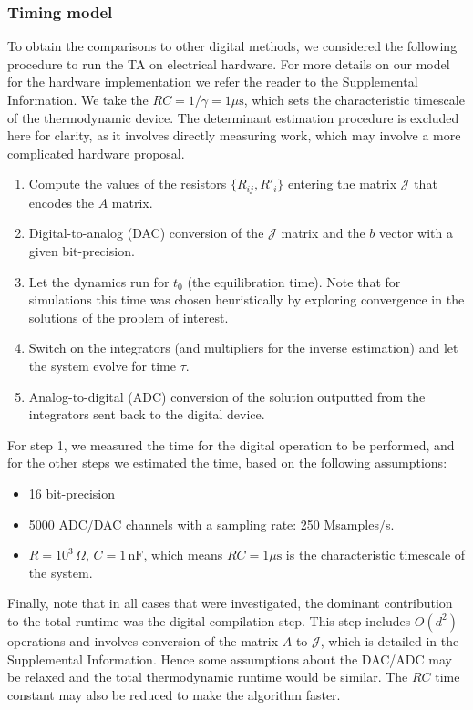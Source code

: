 \documentclass[prx,onecolumn,floatfix,longbibliography,notitlepage, nofootinbib]{revtex4-1}
\begin{document}
\subsubsection{Timing model}

To obtain the comparisons to other digital methods, we considered the following procedure to run the TA on electrical hardware. For more details on our model for the hardware implementation we refer the reader to the Supplemental Information. We take the $RC=1/\gamma = 1 \mu\text{s}$, which sets the characteristic timescale of the thermodynamic device. The determinant estimation procedure is excluded here for clarity, as it involves directly measuring work, which may involve a more complicated hardware proposal.
\begin{enumerate}
     \item Compute the values of the resistors $\{R_{ij}, R'_i\}$ entering the matrix $\mathcal{J}$ that encodes the $A$ matrix.
    \item Digital-to-analog (DAC) conversion of the $\mathcal{J}$ matrix and the $b$ vector with a given bit-precision.
    \item Let the dynamics run for $t_0$ (the equilibration time). Note that for simulations this time was chosen heuristically by exploring convergence in the solutions of the problem of interest.
    \item Switch on the integrators (and multipliers for the inverse estimation) and let the system evolve for time $\tau$.
    \item Analog-to-digital (ADC) conversion of the solution outputted from the integrators sent back to the digital device.
\end{enumerate}
For step 1, we measured the time for the digital operation to be performed, and for the other steps we estimated the time, based on the following assumptions:
\begin{itemize}
    \item 16 bit-precision
    \item 5000 ADC/DAC channels with a sampling rate: 250 Msamples/s.
    \item $R = 10^3 \,\Omega$, $C= 1 \,\text{nF}$, which means $RC = 1 \mu \text{s}$ is the characteristic timescale of the system.
\end{itemize}
Finally, note that in all cases that were investigated, the dominant contribution to the total runtime was the digital compilation step. This step includes $O(d^2)$ operations and involves conversion of the matrix $A$ to $\mathcal{J}$, which is detailed in the Supplemental Information. Hence some assumptions about the DAC/ADC may be relaxed and the total thermodynamic runtime would be similar. The $RC$ time constant may also be reduced to make the algorithm faster.
\end{document}
